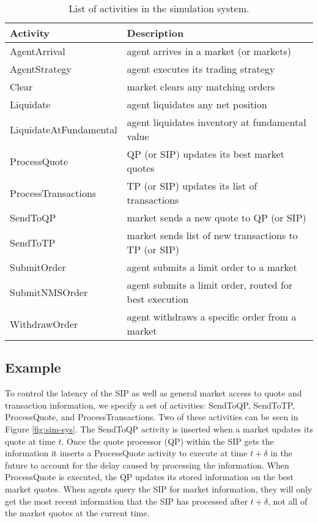 \documentclass[11pt]{article}
\begin{document}
\begin{table}
\centering
\begin{tabular}{l l} \toprule
\textbf{Activity} 	& \textbf{Description} \\ \midrule
\textsf{AgentArrival} 	& agent arrives in a market (or markets) \\
\textsf{AgentStrategy} 	& agent executes its trading strategy \\
\textsf{Clear} 		& market clears any matching orders \\
\textsf{Liquidate}	& agent liquidates any net position \\
\textsf{LiquidateAtFundamental}   & agent liquidates inventory at fundamental value \\
\textsf{ProcessQuote} 	& QP (or SIP) updates its best market quotes \\
\textsf{ProcessTransactions}  & TP (or SIP) updates its list of transactions \\
\textsf{SendToQP} 	& market sends a new quote to QP (or SIP) \\
\textsf{SendToTP}   & market sends list of new transactions to TP (or SIP) \\
\textsf{SubmitOrder} 	& agent submits a limit order to a market \\
\textsf{SubmitNMSOrder} 	& agent submits a limit order, routed for best execution \\
\textsf{WithdrawOrder} 	& agent withdraws a specific order from a market \\ \bottomrule
\end{tabular}
\caption{List of activities in the simulation system.}
\label{tab:activity}
\end{table}

\subsection{Example}

To control the latency of the SIP as well as general market access to quote and transaction information, we specify
a set of activities: \textsf{SendToQP}, \textsf{SendToTP}, \textsf{ProcessQuote}, and \textsf{ProcessTransactions}.
%
Two of these activities can be seen in Figure \ref{fig:sim-sys}.  The
\textsf{SendToQP} activity is inserted when a market updates its quote at time
$t$. Once the quote processor (QP) within the SIP gets the information it inserts a
\textsf{ProcessQuote} activity to execute at time $t + \delta$ in the future to
account for the delay caused by processing the information.
%
When \textsf{ProcessQuote} is executed, the QP updates its stored information on
the best market quotes. When agents query the SIP for market information, they
will only get the most recent information that the SIP has processed after $t+\delta$,
not all of the market quotes at the current time.
\end{document}
